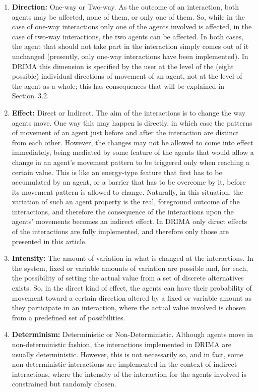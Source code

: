 \documentclass[11pt, a4paper]{article}
\begin{document}
\begin{enumerate}
\item \textbf{Direction:} One-way or Two-way. As the outcome of an interaction, both agents may be affected, none of them, or only one of them. So, while in the case of one-way interactions only one of the agents involved is affected, in the case of two-way interactions, the two agents can be affected. In both cases, the agent that should not take part in the interaction simply comes out of it unchanged (presently, only one-way interactions have been implemented). In DRIMA this dimension is specified by the user at the level of the (eight possible) individual directions of movement of an agent, not at the level of the agent as a whole; this has consequences that will be explained in Section~3.2.

\item \textbf{Effect:} Direct or Indirect. The aim of the interactions is to change the way agents move. One way this may happen is directly, in which case the patterns of movement of an agent just before and after the interaction are distinct from each other. However, the changes may not be allowed to come into effect immediately, being mediated by some feature of the agents that would allow a change in an agent's movement pattern to be triggered only when reaching a certain value. This is like an energy-type feature that first has to be accumulated by an agent, or a barrier that has to be overcome by it, before its movement pattern is allowed to change. Naturally, in this situation, the variation of such an agent property is the real, foreground outcome of the interactions, and therefore the consequence of the interactions upon the agents' movements becomes an indirect effect. In DRIMA only direct effects of the interactions are fully implemented, and therefore only those are presented in this article.

\item \textbf{Intensity:} The amount of variation in what is changed at the interactions. In the system, fixed or variable amounts of variation are possible and, for each, the possibility of setting the actual value from a set of discrete alternatives exists. So, in the direct kind of effect, the agents can have their probability of movement toward a certain direction altered by a fixed or variable amount as they participate in an interaction, where the actual value involved is chosen from a predefined set of possibilities.

\item \textbf{Determinism:} Deterministic or Non-Deterministic. Although agents move in non-deterministic fashion, the interactions implemented in DRIMA are usually deterministic. However, this is not necessarily so, and in fact, some non-deterministic interactions are implemented in the context of indirect interactions, where the intensity of the interaction for the agents involved is constrained but randomly chosen.


\end{enumerate}
\end{document}
